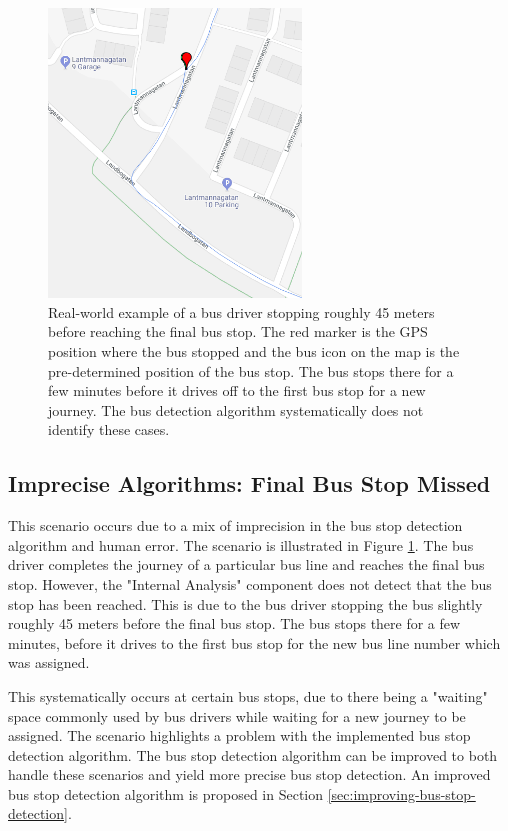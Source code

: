 \begin{figure}[ht!]
    \centering
    \includegraphics[width=0.6\textwidth]{figures/stopped_before_end}
    \caption{Real-world example of a bus driver stopping roughly 45 meters before reaching the final bus stop.
    The red marker is the GPS position where the bus stopped and the bus icon on the map is the pre-determined position of the bus stop.
    The bus stops there for a few minutes before it drives off to the first bus stop for a new journey.
    The bus detection algorithm systematically does not identify these cases.}
    \label{fig:stopped-before-end}
\end{figure}

\subsection{Imprecise Algorithms: Final Bus Stop Missed}
This scenario occurs due to a mix of imprecision in the bus stop detection algorithm and human error.
The scenario is illustrated in Figure \ref{fig:stopped-before-end}.
The bus driver completes the journey of a particular bus line and reaches the final bus stop.
However, the "Internal Analysis" component does not detect that the bus stop has been reached.
This is due to the bus driver stopping the bus slightly roughly 45 meters before the final bus stop.
The bus stops there for a few minutes, before it drives to the first bus stop for the new bus line number which was assigned.

This systematically occurs at certain bus stops, due to there being a "waiting" space commonly used by bus drivers while waiting for a new journey to be assigned.
The scenario highlights a problem with the implemented bus stop detection algorithm.
The bus stop detection algorithm can be improved to both handle these scenarios and yield more precise bus stop detection.
An improved bus stop detection algorithm is proposed in Section \ref{sec:improving-bus-stop-detection}.

